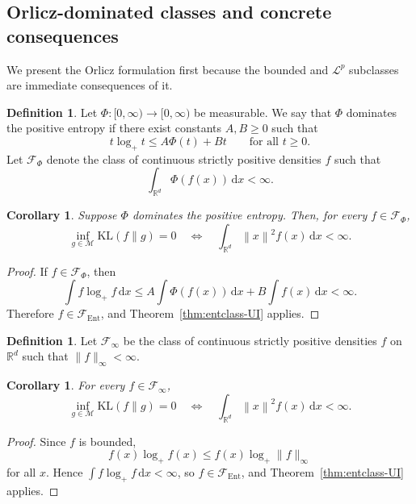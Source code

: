 \documentclass[11pt]{article}
\newtheorem{corollary}[theorem]{Corollary}
\theoremstyle{definition}
\newtheorem{definition}[theorem]{Definition}
\begin{document}
\subsection{Orlicz-dominated classes and concrete consequences}

We present the Orlicz formulation first because the bounded and $\mathcal L^p$ subclasses are immediate consequences of it.

\begin{definition}
Let $\Phi:[0,\infty)\to[0,\infty)$ be measurable. We say that $\Phi$ dominates the positive entropy if there exist constants $A,B\ge0$ such that
\[
t\log_+t\le A\Phi(t)+Bt
\qquad\text{for all }t\ge0.
\]
Let $\mathcal F_{\Phi}$ denote the class of continuous strictly positive densities $f$ such that
\[
\int_{\mathbb{R}^d}\Phi(f(x))\,\mathrm{d}x<\infty.
\]
\end{definition}

\begin{corollary}
\label{cor:orlicz}
Suppose $\Phi$ dominates the positive entropy. Then, for every $f\in\mathcal F_{\Phi}$,
\[
\inf_{g\in\mathcal M}\mathrm{KL}(f\|g)=0
\quad\Longleftrightarrow\quad
\int_{\mathbb{R}^d}\left\lVert x \right\rVert^2f(x)\,\mathrm{d}x<\infty.
\]
\end{corollary}

\begin{proof}
If $f\in\mathcal F_{\Phi}$, then
\[
\int f\log_+f\,\mathrm{d}x
\le A\int \Phi(f(x))\,\mathrm{d}x + B\int f(x)\,\mathrm{d}x <\infty.
\]
Therefore $f\in\mathcal F_{\mathrm{Ent}}$, and Theorem~\ref{thm:entclass-UI} applies.
\end{proof}

\begin{definition}
Let $\mathcal F_{\infty}$ be the class of continuous strictly positive densities $f$ on $\mathbb{R}^d$ such that $\|f\|_{\infty}<\infty$.
\end{definition}

\begin{corollary}
\label{cor:bounded}
For every $f\in\mathcal F_{\infty}$,
\[
\inf_{g\in\mathcal M}\mathrm{KL}(f\|g)=0
\quad\Longleftrightarrow\quad
\int_{\mathbb{R}^d}\left\lVert x \right\rVert^2f(x)\,\mathrm{d}x<\infty.
\]
\end{corollary}

\begin{proof}
Since $f$ is bounded,
\[
f(x)\log_+f(x)\le f(x)\log_+\|f\|_\infty
\]
for all $x$. Hence $\int f\log_+f\,\mathrm{d}x<\infty$, so $f\in\mathcal F_{\mathrm{Ent}}$, and Theorem~\ref{thm:entclass-UI} applies.
\end{proof}
\end{document}

